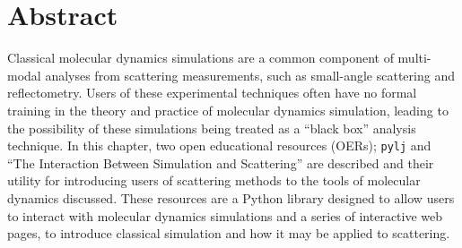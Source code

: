 \section*{Abstract}
Classical molecular dynamics simulations are a common component of multi-modal analyses from scattering measurements, such as small-angle scattering and reflectometry.
Users of these experimental techniques often have no formal training in the theory and practice of molecular dynamics simulation, leading to the possibility of these simulations being treated as a ``black box'' analysis technique.
In this chapter, two open educational resources (OERs); \texttt{pylj} and ``The Interaction Between Simulation and Scattering'' are described and their utility for introducing users of scattering methods to the tools of molecular dynamics discussed.
These resources are a Python library designed to allow users to interact with molecular dynamics simulations and a series of interactive web pages, to introduce classical simulation and how it may be applied to scattering.
